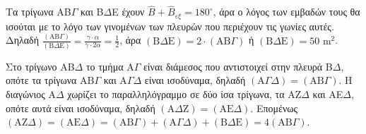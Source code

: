 \begin{alist}
    \item Τα τρίγωνα AB$\Gamma$ και B$\Delta$E έχουν $\hat{B} + \hat{B}_{\varepsilon\xi}=180^\circ$, άρα ο λόγος των εμβαδών τους θα ισούται με το λόγο των γινομένων των πλευρών που περιέχουν τις γωνίες αυτές. Δηλαδή $\frac{(\text{AB}\Gamma)}{(\text{B}\Delta\text{E})} = \frac{\gamma \cdot \alpha}{\gamma \cdot 2\alpha} = \frac{1}{2}$, άρα $(\text{B}\Delta\text{E}) = 2 \cdot (\text{AB}\Gamma)$ ή $(\text{B}\Delta\text{E}) = 50 \text{ m}^2$.
    \item Στο τρίγωνο AB$\Delta$ το τμήμα A$\Gamma$ είναι διάμεσος που αντιστοιχεί στην πλευρά B$\Delta$, οπότε τα τρίγωνα AB$\Gamma$ και A$\Gamma\Delta$ είναι ισοδύναμα, δηλαδή $(\text{A}\Gamma\Delta) = (\text{AB}\Gamma)$. Η διαγώνιος A$\Delta$ χωρίζει το παραλληλόγραμμο σε δύο ίσα τρίγωνα, τα AZ$\Delta$ και AE$\Delta$, οπότε αυτά είναι ισοδύναμα, δηλαδή $(\text{A}\Delta\text{Z}) = (\text{AE}\Delta)$. Επομένως $(\text{AZ}\Delta) = (\text{AE}\Delta) = (\text{AB}\Gamma) + (\text{A}\Gamma\Delta) + (\text{B}\Delta\text{E}) = 4(\text{AB}\Gamma)$.
\end{alist}